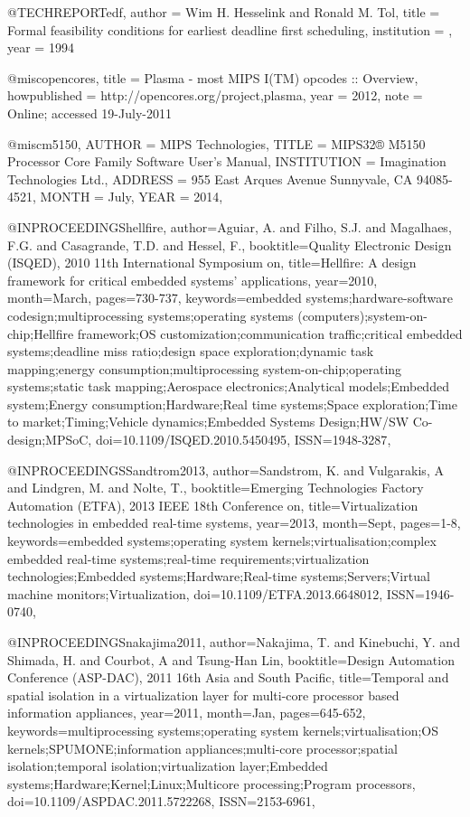 @TECHREPORT{edf,
    author = {Wim H. Hesselink and Ronald M. Tol},
    title = {Formal feasibility conditions for earliest deadline first scheduling},
    institution = {},
    year = {1994}
}

@misc{opencores,
  title = {Plasma - most MIPS I(TM) opcodes :: Overview},
  howpublished = {http://opencores.org/project,plasma},
  year = {2012}, 
  note = {Online; accessed 19-July-2011}
}


@misc{m5150,
  AUTHOR =        {MIPS Technologies},
  TITLE =         {MIPS32® M5150 Processor Core Family Software User’s Manual},
  INSTITUTION =   {Imagination Technologies Ltd.},
  ADDRESS =       {955 East Arques Avenue Sunnyvale, CA 94085-4521},
  MONTH =         {July},
  YEAR  =         {2014},
}

@INPROCEEDINGS{hellfire, 
author={Aguiar, A. and Filho, S.J. and Magalhaes, F.G. and Casagrande, T.D. and Hessel, F.}, 
booktitle={Quality Electronic Design (ISQED), 2010 11th International Symposium on}, 
title={Hellfire: A design framework for critical embedded systems' applications}, 
year={2010}, 
month={March}, 
pages={730-737}, 
keywords={embedded systems;hardware-software codesign;multiprocessing systems;operating systems (computers);system-on-chip;Hellfire framework;OS customization;communication traffic;critical embedded systems;deadline miss ratio;design space exploration;dynamic task mapping;energy consumption;multiprocessing system-on-chip;operating systems;static task mapping;Aerospace electronics;Analytical models;Embedded system;Energy consumption;Hardware;Real time systems;Space exploration;Time to market;Timing;Vehicle dynamics;Embedded Systems Design;HW/SW Co-design;MPSoC}, 
doi={10.1109/ISQED.2010.5450495}, 
ISSN={1948-3287},}

@INPROCEEDINGS{Sandtrom2013, 
author={Sandstrom, K. and Vulgarakis, A and Lindgren, M. and Nolte, T.}, 
booktitle={Emerging Technologies Factory Automation (ETFA), 2013 IEEE 18th Conference on}, 
title={Virtualization technologies in embedded real-time systems}, 
year={2013}, 
month={Sept}, 
pages={1-8}, 
keywords={embedded systems;operating system kernels;virtualisation;complex embedded real-time systems;real-time requirements;virtualization technologies;Embedded systems;Hardware;Real-time systems;Servers;Virtual machine monitors;Virtualization}, 
doi={10.1109/ETFA.2013.6648012}, 
ISSN={1946-0740},}

@INPROCEEDINGS{nakajima2011, 
author={Nakajima, T. and Kinebuchi, Y. and Shimada, H. and Courbot, A and Tsung-Han Lin}, 
booktitle={Design Automation Conference (ASP-DAC), 2011 16th Asia and South Pacific}, 
title={Temporal and spatial isolation in a virtualization layer for multi-core processor based information appliances}, 
year={2011}, 
month={Jan}, 
pages={645-652}, 
keywords={multiprocessing systems;operating system kernels;virtualisation;OS kernels;SPUMONE;information appliances;multi-core processor;spatial isolation;temporal isolation;virtualization layer;Embedded systems;Hardware;Kernel;Linux;Multicore processing;Program processors}, 
doi={10.1109/ASPDAC.2011.5722268}, 
ISSN={2153-6961},}


